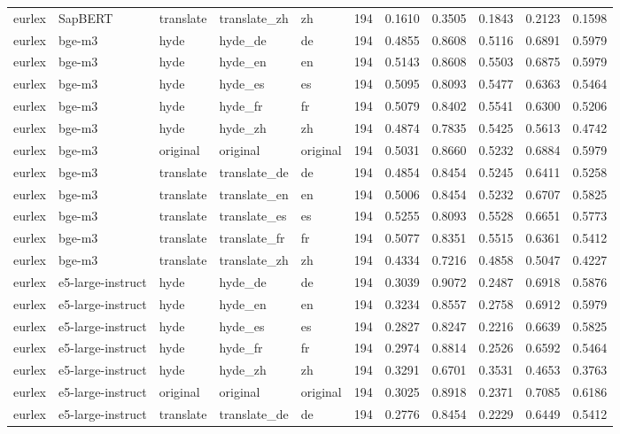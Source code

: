 \begin{tabular}{lllllrrrrrr}
eurlex & SapBERT & translate & translate\_zh & zh & 194 & 0.1610 & 0.3505 & 0.1843 & 0.2123 & 0.1598 \\
eurlex & bge-m3 & hyde & hyde\_de & de & 194 & 0.4855 & 0.8608 & 0.5116 & 0.6891 & 0.5979 \\
eurlex & bge-m3 & hyde & hyde\_en & en & 194 & 0.5143 & 0.8608 & 0.5503 & 0.6875 & 0.5979 \\
eurlex & bge-m3 & hyde & hyde\_es & es & 194 & 0.5095 & 0.8093 & 0.5477 & 0.6363 & 0.5464 \\
eurlex & bge-m3 & hyde & hyde\_fr & fr & 194 & 0.5079 & 0.8402 & 0.5541 & 0.6300 & 0.5206 \\
eurlex & bge-m3 & hyde & hyde\_zh & zh & 194 & 0.4874 & 0.7835 & 0.5425 & 0.5613 & 0.4742 \\
eurlex & bge-m3 & original & original & original & 194 & 0.5031 & 0.8660 & 0.5232 & 0.6884 & 0.5979 \\
eurlex & bge-m3 & translate & translate\_de & de & 194 & 0.4854 & 0.8454 & 0.5245 & 0.6411 & 0.5258 \\
eurlex & bge-m3 & translate & translate\_en & en & 194 & 0.5006 & 0.8454 & 0.5232 & 0.6707 & 0.5825 \\
eurlex & bge-m3 & translate & translate\_es & es & 194 & 0.5255 & 0.8093 & 0.5528 & 0.6651 & 0.5773 \\
eurlex & bge-m3 & translate & translate\_fr & fr & 194 & 0.5077 & 0.8351 & 0.5515 & 0.6361 & 0.5412 \\
eurlex & bge-m3 & translate & translate\_zh & zh & 194 & 0.4334 & 0.7216 & 0.4858 & 0.5047 & 0.4227 \\
eurlex & e5-large-instruct & hyde & hyde\_de & de & 194 & 0.3039 & 0.9072 & 0.2487 & 0.6918 & 0.5876 \\
eurlex & e5-large-instruct & hyde & hyde\_en & en & 194 & 0.3234 & 0.8557 & 0.2758 & 0.6912 & 0.5979 \\
eurlex & e5-large-instruct & hyde & hyde\_es & es & 194 & 0.2827 & 0.8247 & 0.2216 & 0.6639 & 0.5825 \\
eurlex & e5-large-instruct & hyde & hyde\_fr & fr & 194 & 0.2974 & 0.8814 & 0.2526 & 0.6592 & 0.5464 \\
eurlex & e5-large-instruct & hyde & hyde\_zh & zh & 194 & 0.3291 & 0.6701 & 0.3531 & 0.4653 & 0.3763 \\
eurlex & e5-large-instruct & original & original & original & 194 & 0.3025 & 0.8918 & 0.2371 & 0.7085 & 0.6186 \\
eurlex & e5-large-instruct & translate & translate\_de & de & 194 & 0.2776 & 0.8454 & 0.2229 & 0.6449 & 0.5412 \\

\end{tabular}
